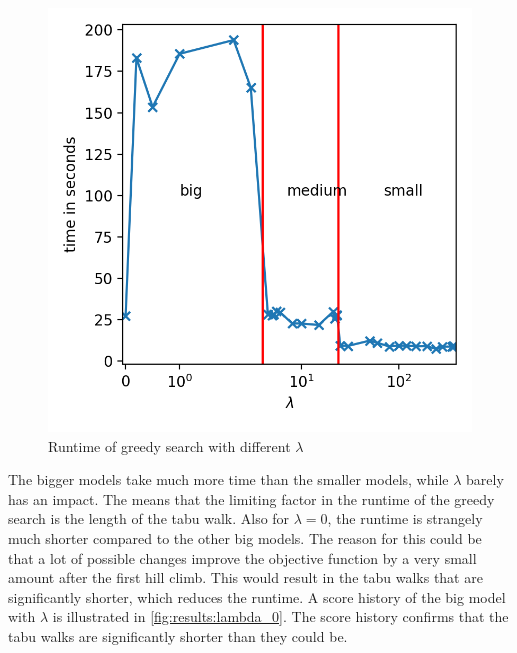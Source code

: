 \documentclass[sigconf, fleqn, prologue, dvipsnames]{acmart}
\begin{document}
\begin{figure}
	\centering
	\includegraphics[scale=0.5]{graphics/times.png}
	\caption{Runtime of greedy search with different $\lambda$}
	\label{fig:results:runtime}
\end{figure}

The bigger models take much more time than the smaller models, while $\lambda$ barely has an impact.
The means that the limiting factor in the runtime of the greedy search is the length of the tabu walk.
Also for $\lambda = 0$, the runtime is strangely much shorter compared to the other big models.
The reason for this could be that a lot of possible changes improve the objective function by a very small amount after the first hill climb.
This would result in the tabu walks that are significantly shorter, which reduces the runtime.
A score history of the big model with $\lambda$ is illustrated in \autoref{fig:results:lambda_0}.
The score history confirms that the tabu walks are significantly shorter than they could be.
\end{document}
